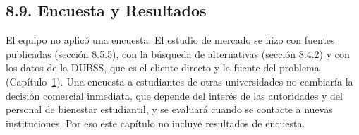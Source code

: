 \subsection{8.9. Encuesta y Resultados}

El equipo no aplicó una encuesta. El estudio de mercado se hizo con fuentes publicadas (sección 8.5.5), con la búsqueda de alternativas (sección 8.4.2) y con los datos de la DUBSS, que es el cliente directo y la fuente del problema (Capítulo~\hyperref[cap:paps]{1}). Una encuesta a estudiantes de otras universidades no cambiaría la decisión comercial inmediata, que depende del interés de las autoridades y del personal de bienestar estudiantil, y se evaluará cuando se contacte a nuevas instituciones. Por eso este capítulo no incluye resultados de encuesta.
